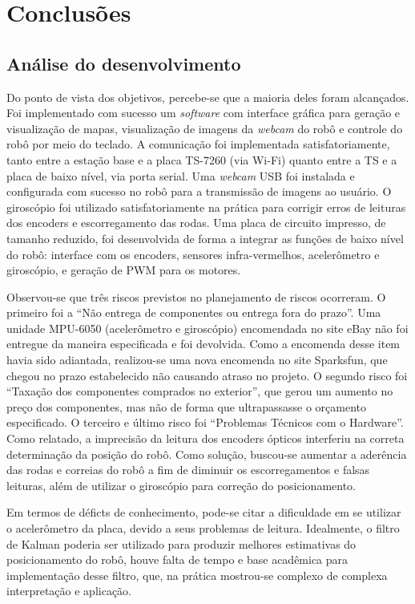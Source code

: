 \chapter{Conclusões}

\section{Análise do desenvolvimento}

Do ponto de vista dos objetivos, percebe-se que a maioria deles foram alcançados. Foi implementado com sucesso um \textit{software} com interface gráfica para geração e visualização de mapas, visualização de imagens da \textit{webcam} do robô e controle do robô por meio do teclado. A comunicação foi implementada satisfatoriamente, tanto entre a estação base e a placa TS-7260 (via Wi-Fi) quanto entre a TS e a placa de baixo nível, via porta serial. Uma \textit{webcam} USB foi instalada e configurada com sucesso no robô para a transmissão de imagens ao usuário. O giroscópio foi utilizado satisfatoriamente na prática para corrigir erros de leituras dos encoders e escorregamento das rodas. Uma placa de circuito impresso, de tamanho reduzido, foi desenvolvida de forma a integrar as funções de baixo nível do robô: interface com os encoders, sensores infra-vermelhos, acelerômetro e giroscópio, e geração de PWM para os motores.

Observou-se que três riscos previstos no planejamento de riscos ocorreram. O primeiro foi a ``Não entrega de componentes ou entrega fora do prazo''. Uma unidade MPU-6050 (acelerômetro e giroscópio) encomendada no site eBay não foi entregue da maneira especificada e foi devolvida. Como a encomenda desse item havia sido adiantada, realizou-se uma nova encomenda no site Sparksfun, que chegou no prazo estabelecido não causando atraso no projeto. O segundo risco foi ``Taxação dos componentes comprados no exterior'', que gerou um aumento no preço dos componentes, mas não de forma que ultrapassasse o orçamento especificado. O terceiro e último risco foi ``Problemas Técnicos com o Hardware''. Como relatado, a imprecisão da leitura dos encoders ópticos interferiu na correta determinação da posição do robô. Como solução, buscou-se aumentar a aderência das rodas e correias do robô a fim de diminuir os escorregamentos e falsas leituras, além de utilizar o giroscópio para correção do posicionamento.

Em termos de déficts de conhecimento, pode-se citar a dificuldade em se utilizar o acelerômetro da placa, devido a seus problemas de leitura. Idealmente, o filtro de Kalman poderia ser utilizado para produzir melhores estimativas do posicionamento do robô, houve falta de tempo e base acadêmica para implementação desse filtro, que, na prática mostrou-se complexo de complexa interpretação e aplicação.

